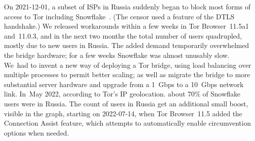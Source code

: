 \documentclass[letterpaper,twocolumn]{article}
\begin{document}
On \mbox{2021-12-01}, a subset of ISPs in Russia suddenly began to block
most forms of access to Tor
including Snowflake~\cite{ooni-2021-russia-blocks-tor}.
(The censor used a feature of the DTLS handshake.)
We released workarounds within a few weeks in
Tor Browser~11.5a1 and~11.0.3,
and in the next two months the total number of users quadrupled,
mostly due to new users in Russia.
The added demand temporarily overwhelmed the bridge hardware;
for a few weeks Snowflake was almost unusably slow.
We~had to invent a new way of deploying a Tor bridge,
using load balancing over multiple processes to permit better scaling;
as well as migrate the bridge to more substantial server hardware
and upgrade from a 1~Gbps to a 10~Gbps network link.
In~May 2022, according to Tor's IP geolocation.
about 70\% of Snowflake users were in Russia.
The count of users in Russia get an additional small boost,
visible in the graph,
starting on \mbox{2022-07-14},
when Tor Browser~11.5 added the Connection Assist feature,
which attempts to automatically enable circumvention options when needed.
\end{document}

